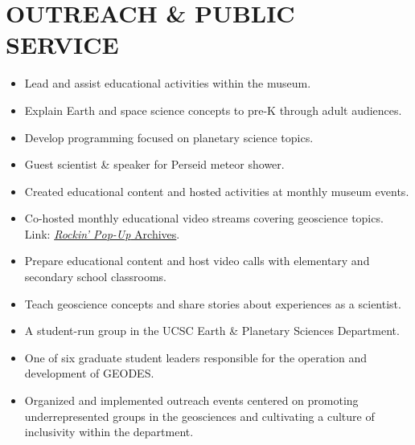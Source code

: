 \section*{OUTREACH \& PUBLIC SERVICE}

\begin{itemize}
\item Lead and assist educational activities within the museum.
\item Explain Earth and space science concepts to pre-K through adult audiences.
\item Develop programming focused on planetary science topics.
\end{itemize}

\begin{itemize}
	\item Guest scientist \& speaker for Perseid meteor shower. 
\end{itemize}

\begin{itemize}
	\item Created educational content and hosted activities at monthly museum events.
	\item Co-hosted monthly educational video streams covering geoscience topics. \\
	Link: \href{https://www.santacruzmuseum.org/category/rockin-pop-up/}{\emph{Rockin' Pop-Up} Archives}.
\end{itemize}

\begin{itemize}
	\item Prepare educational content and host video calls with elementary and secondary school classrooms.
	\item Teach geoscience concepts and share stories about experiences as a scientist.
\end{itemize}

\begin{itemize}
	\item A student-run group in the UCSC Earth \& Planetary Sciences Department.
	\item One of six graduate student leaders responsible for the operation and development of GEODES.
	\item Organized and implemented outreach events centered on promoting underrepresented groups in the geosciences and cultivating a culture of inclusivity within the department.
\end{itemize}

